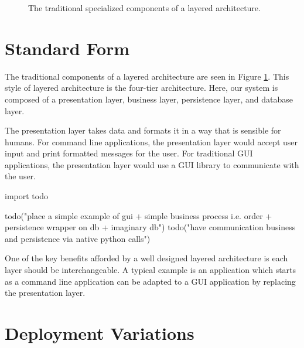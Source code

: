 \begin{figure}[h]
\centering
{}
\caption{The traditional specialized components of a layered architecture.}
\label{fig:traditional-layered}
\end{figure}

\section{Standard Form}

The traditional components of a layered architecture are seen in Figure \ref{fig:traditional-layered}.
This style of layered architecture is the four-tier architecture.
Here, our system is composed of a presentation layer, business layer, persistence layer, and database layer.

The presentation layer takes data and formats it in a way that is sensible for humans.
For command line applications, the presentation layer would accept user input and print formatted messages for the user.
For traditional GUI applications, the presentation layer would use a GUI library to communicate with the user.



\begin{code}[style=python]
import todo

todo("place a simple example of gui + simple business process i.e. order + persistence wrapper on db + imaginary db")
todo("have communication business and persistence via native python calls")
\end{code}

One of the key benefits afforded by a well designed layered architecture is each layer should be interchangeable.
A typical example is an application which starts as a command line application can be adapted to a GUI application by replacing the presentation layer.

\section{Deployment Variations}

